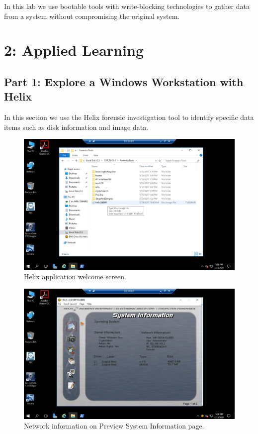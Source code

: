 In this lab we use bootable tools with write-blocking technologies to gather data from a system without compromising the original system.

\section*{2: Applied Learning}

\subsection*{Part 1: Explore a Windows Workstation with Helix}

In this section we use the Helix forensic investigation tool to identify specific data items such as disk information and image data.

\begin{figure}[H]
    \centering
    \includegraphics[width=\linewidth]{figures/Part 1 Step 2.png}
    \caption{Helix application welcome screen.}
\end{figure}

\begin{figure}[H]
    \centering
    \includegraphics[width=\linewidth]{figures/Part 1 Step 4.png}
    \caption{Network information on Preview System Information page.}
\end{figure}

